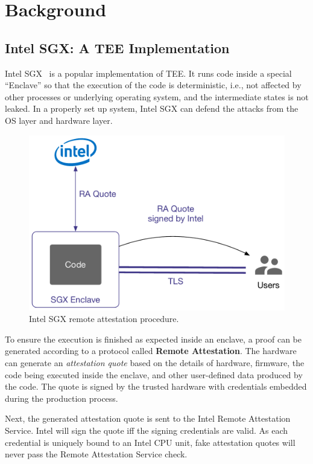 \section{Background}

\subsection{Intel SGX: A TEE Implementation}

Intel SGX~\cite{sgxdoc} is a popular implementation of TEE. It runs code inside a special ``Enclave'' so that the execution of the code is deterministic, i.e., not affected by other processes or underlying operating system, and the intermediate states is not leaked. In a properly set up system, Intel SGX can defend the attacks from the OS layer and hardware layer.

\begin{figure}
    \centering \footnotesize
    \includegraphics[width=.7\columnwidth]{img/pLIBRA-sgxra}
    \caption{Intel SGX remote attestation procedure.}
    \label{fig:sgx-ra}
\end{figure}

To ensure the execution is finished as expected inside an enclave, a proof can be generated according to a protocol called \textbf{Remote Attestation}. The hardware can generate an \textit{attestation quote} based on the details of hardware, firmware, the code being executed inside the enclave, and other user-defined data produced by the code. The quote is signed by the trusted hardware with credentials embedded during the production process.

Next, the generated attestation quote is sent to the Intel Remote Attestation Service. Intel will sign the quote iff the signing credentials are valid. As each credential is uniquely bound to an Intel CPU unit, fake attestation quotes will never pass the Remote Attestation Service check.

